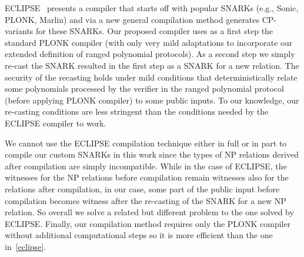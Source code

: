 ECLIPSE~\cite{eclipse} presents a compiler that starts off with popular SNARKs (e.g., Sonic, PLONK, 
Marlin) and via a new general compilation method generates CP-variants for these SNARKs. 
Our proposed compiler uses as a first step the standard PLONK compiler (with only very mild 
adaptations to incorporate our extended definition of ranged polynomial protocols). 
As a second step we simply re-cast the SNARK resulted in the first step as a SNARK for a new relation. 
The security of the recasting holds under mild conditions that deterministically relate some polynomials 
processed by the verifier in the ranged polynomial protocol (before applying PLONK compiler) to some 
public inputs. To our knowledge, our re-casting conditions are less stringent than the conditions needed 
by the ECLIPSE compiler to work.

We cannot use the ECLIPSE compilation technique either in full or in part to compile our custom SNARKs 
in this work since the types of NP relations derived after compilation are simply incompatible. While in the 
case of ECLIPSE, the witnesses for the NP relations before compilation remain witnesses also for the relations 
after compilation, in our case, some part of the public input before compilation becomes witness after the 
re-casting of the SNARK for a new NP relation. So overall we solve a related but different problem to the one 
solved by ECLIPSE. Finally, our compilation method requires only the PLONK compiler without additional computational 
steps so it is more efficient than the one in~\ref{eclipse}. 

  


